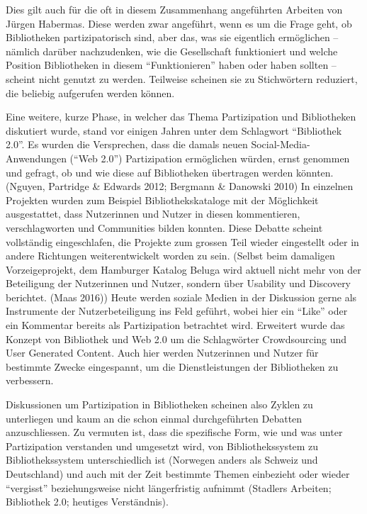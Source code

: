 \documentclass[a4paper,
fontsize=11pt,
oneside,
numbers=noperiodatend,
parskip=half-,
bibliography=totoc,
final
]{scrartcl}
\begin{document}
Dies gilt auch für die oft in diesem Zusammenhang angeführten Arbeiten
von Jürgen Habermas. Diese werden zwar angeführt, wenn es um die Frage
geht, ob Bibliotheken partizipatorisch sind, aber das, was sie
eigentlich ermöglichen -- nämlich darüber nachzudenken, wie die
Gesellschaft funktioniert und welche Position Bibliotheken in diesem
\enquote{Funktionieren} haben oder haben sollten -- scheint nicht
genutzt zu werden. Teilweise scheinen sie zu Stichwörtern reduziert, die
beliebig aufgerufen werden können.

Eine weitere, kurze Phase, in welcher das Thema Partizipation und
Bibliotheken diskutiert wurde, stand vor einigen Jahren unter dem
Schlagwort \enquote{Bibliothek 2.0}. Es wurden die Versprechen, dass die
damals neuen Social-Media-Anwendungen (\enquote{Web 2.0}) Partizipation
ermöglichen würden, ernst genommen und gefragt, ob und wie diese auf
Bibliotheken übertragen werden könnten. (Nguyen, Partridge \& Edwards
2012; Bergmann \& Danowski 2010) In einzelnen Projekten wurden zum
Beispiel Bibliothekskataloge mit der Möglichkeit ausgestattet, dass
Nutzerinnen und Nutzer in diesen kommentieren, verschlagworten und
Communities bilden konnten. Diese Debatte scheint vollständig
eingeschlafen, die Projekte zum grossen Teil wieder eingestellt oder in
andere Richtungen weiterentwickelt worden zu sein. (Selbst beim
damaligen Vorzeigeprojekt, dem Hamburger Katalog Beluga wird aktuell
nicht mehr von der Beteiligung der Nutzerinnen und Nutzer, sondern über
Usability und Discovery berichtet. (Maas 2016)) Heute werden soziale
Medien in der Diskussion gerne als Instrumente der Nutzerbeteiligung ins
Feld geführt, wobei hier ein \enquote{Like} oder ein Kommentar bereits
als Partizipation betrachtet wird. Erweitert wurde das Konzept von
Bibliothek und Web 2.0 um die Schlagwörter Crowdsourcing und User
Generated Content. Auch hier werden Nutzerinnen und Nutzer für bestimmte
Zwecke eingespannt, um die Dienstleistungen der Bibliotheken zu
verbessern.

Diskussionen um Partizipation in Bibliotheken scheinen also Zyklen zu
unterliegen und kaum an die schon einmal durchgeführten Debatten
anzuschliessen. Zu vermuten ist, dass die spezifische Form, wie und was
unter Partizipation verstanden und umgesetzt wird, von Bibliothekssystem
zu Bibliothekssystem unterschiedlich ist (Norwegen anders als Schweiz
und Deutschland) und auch mit der Zeit bestimmte Themen einbezieht oder
wieder \enquote{vergisst} beziehungsweise nicht längerfristig aufnimmt
(Stadlers Arbeiten; Bibliothek 2.0; heutiges Verständnis).
\end{document}
